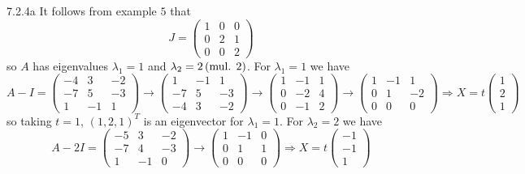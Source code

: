 \documentclass{exam}
\begin{document}
  \begin{problem}{7.2.4a}
    It follows from example $5$ that 
    \[
      J = \begin{pmatrix}
        1 & 0 & 0 \\
        0 & 2 & 1 \\
        0 & 0 & 2
      \end{pmatrix}
    \]
    so $A$ has eigenvalues $\lambda_1 = 1$ and $\lambda_2 = 2 \,(\text{mul. } 2)$. For $\lambda_1 = 1$ we have 
    \[
      A - I = \begin{pmatrix}
        -4 & 3 & -2 \\
        -7 & 5 & -3 \\
        1 & -1 & 1
      \end{pmatrix}
      \to \begin{pmatrix}
        1 & -1 & 1 \\
        -7 & 5 & -3 \\
        -4 & 3 & -2
      \end{pmatrix}
      \to \begin{pmatrix}
        1 & -1 & 1 \\
        0 & -2 & 4 \\
        0 & -1 & 2
      \end{pmatrix}
      \to \begin{pmatrix}
        1 & -1 & 1 \\
        0 & 1 & -2 \\
        0 & 0 & 0 
      \end{pmatrix}
      \Rightarrow X = t\begin{pmatrix}
        1 \\ 2 \\ 1
      \end{pmatrix}
    \]
    so taking $t = 1$, $(1, 2, 1)^{T}$ is an eigenvector for $\lambda_1 = 1$. For $\lambda_2 = 2$ we have
    \[
      A - 2I = \begin{pmatrix}
        -5 & 3 & -2 \\
        -7 & 4 & -3 \\
        1 & -1 & 0
      \end{pmatrix}
      \to \begin{pmatrix}
        1 & -1 & 0 \\
        0 & 1 & 1 \\
        0 & 0 & 0
      \end{pmatrix}
      \Rightarrow X = t\begin{pmatrix}
        -1 \\ -1 \\ 1

\end{pmatrix}\]
\end{problem}
\end{document}
